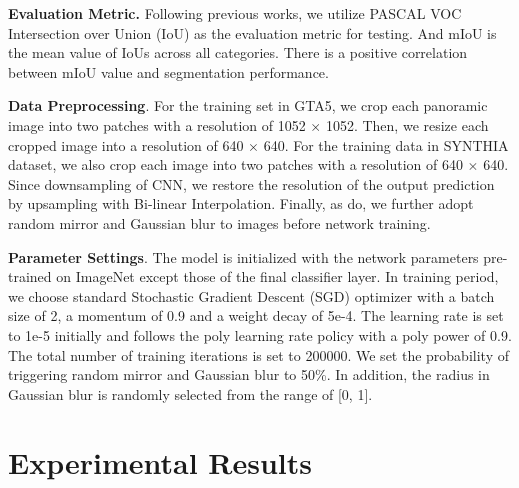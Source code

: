 \documentclass[twocolumn,journal,vlined,ruled,linesnumbered]{IEEEtran}
\begin{document}
\textbf{Evaluation Metric.} Following previous works, we utilize PASCAL VOC Intersection over Union (IoU) \cite{everingham2015pascal} as the evaluation metric for testing. And mIoU is the mean value of IoUs across all categories. There is a positive correlation between mIoU value and segmentation performance.

\textbf{Data Preprocessing}. For the training set in GTA5, we crop each panoramic image into two patches with a resolution of 1052 $\times$ 1052. Then, we resize each cropped image into a resolution of 640 $\times$ 640. For the training data in SYNTHIA dataset, we also crop each image into two patches with a resolution of 640 $\times$ 640. Since downsampling of CNN, we restore the resolution of the output prediction by upsampling with Bi-linear Interpolation. Finally, as \cite{zhao2017pyramid,chen2019domain} do, we further adopt random mirror and Gaussian blur to images before network training.

\textbf{Parameter Settings}. The model is initialized with the network parameters pre-trained on ImageNet \cite{deng2009imagenet:} except those of the final classifier layer. In training period, we choose standard Stochastic Gradient Descent (SGD) \cite{krizhevsky2012imagenet} optimizer with a batch size of 2, a momentum of 0.9 and a weight decay of 5e-4. The learning rate is set to 1e-5 initially and follows the poly learning rate policy \cite{chen2017rethinking} with a poly power of 0.9. The total number of training iterations is set to 200000. We set the probability of triggering random mirror and Gaussian blur to 50\%. In addition, the radius in Gaussian blur is randomly selected from the range of {[}0, 1{]}.

\section{Experimental Results\label{sec:Experimental-Results}}
\end{document}
